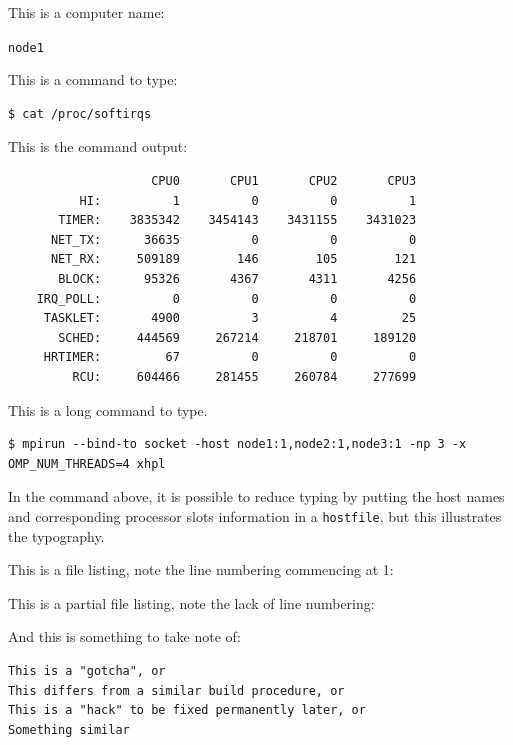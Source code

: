 \documentclass{report}
\begin{document}
This is a computer name:

\verb|node1|

This is a command to type:

\lstset{style=type}
\begin{lstlisting}[]
$ cat /proc/softirqs
\end{lstlisting}


This is the command output:

\lstset{style=term}
\begin{lstlisting}
                    CPU0       CPU1       CPU2       CPU3       
          HI:          1          0          0          1
       TIMER:    3835342    3454143    3431155    3431023
      NET_TX:      36635          0          0          0
      NET_RX:     509189        146        105        121
       BLOCK:      95326       4367       4311       4256
    IRQ_POLL:          0          0          0          0
     TASKLET:       4900          3          4         25
       SCHED:     444569     267214     218701     189120
     HRTIMER:         67          0          0          0
         RCU:     604466     281455     260784     277699
\end{lstlisting}

This is a long command to type.

\lstset{style=type}
\begin{lstlisting}[]
$ mpirun --bind-to socket -host node1:1,node2:1,node3:1 -np 3 -x OMP_NUM_THREADS=4 xhpl
\end{lstlisting}

In the command above, it is possible to reduce typing by putting the host names and corresponding processor slots information in a \verb|hostfile|, but this illustrates the typography.

This is a file listing, note the line numbering commencing at 1:

\lstset{style=listing}


This is a partial file listing, note the lack of line numbering:

\lstset{style=listing}


And this is something to take note of:

\lstset{style=hack}
\begin{lstlisting}
This is a "gotcha", or
This differs from a similar build procedure, or
This is a "hack" to be fixed permanently later, or
Something similar
\end{lstlisting}
\end{document}
